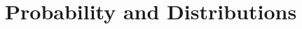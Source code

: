 	\newpage
	\chapter{Probability and Distributions}
	
	\begin{tcolorbox}[colframe=defcolor,title={\color{white}\bf }]
		\begin{definition}
			
		\end{definition}
	\end{tcolorbox}
	\begin{tcolorbox}[colframe=thmcolor,title={\color{white}\bf }]
		\begin{theorem}
			
		\end{theorem}
	\end{tcolorbox}
